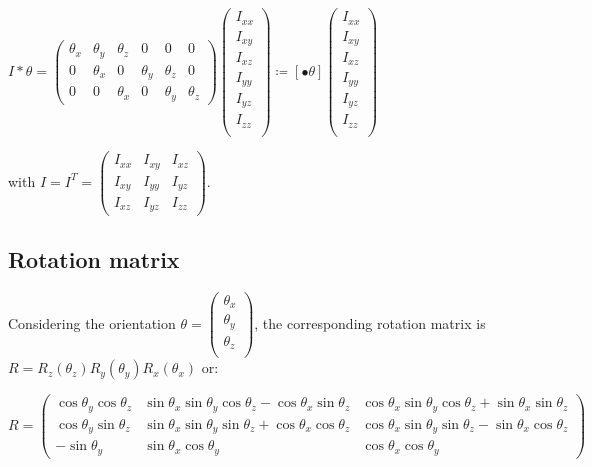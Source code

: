 \documentclass[\main/main.tex]{subfiles}
\begin{document}
{\centering
 $ I \ast \theta =
 \begin{pmatrix}
  \theta_x & \theta_y & \theta_z & 0        & 0        & 0        \\
  0        & \theta_x & 0        & \theta_y & \theta_z & 0        \\
  0        & 0        & \theta_x & 0        & \theta_y & \theta_z
 \end{pmatrix}
 \begin{pmatrix}
  I_{xx} \\
  I_{xy} \\
  I_{xz} \\
  I_{yy} \\
  I_{yz} \\
  I_{zz} \\
 \end{pmatrix}
 \coloneqq \left[ \bullet \theta \right]
 \begin{pmatrix}
  I_{xx} \\
  I_{xy} \\
  I_{xz} \\
  I_{yy} \\
  I_{yz} \\
  I_{zz} \\
 \end{pmatrix}$
 \par}

with $I = I^T =
\begin{pmatrix}
 I_{xx} & I_{xy} & I_{xz} \\
 I_{xy} & I_{yy} & I_{yz} \\
 I_{xz} & I_{yz} & I_{zz}
\end{pmatrix}
$.


\subsection{Rotation matrix}

\label{rotation}

Considering the orientation $\theta =
\begin{pmatrix}
 \theta_x \\
 \theta_y \\
 \theta_z \\
\end{pmatrix}
$,
the corresponding rotation matrix is $R = R_z(\theta_z)R_y(\theta_y)R_x(\theta_x)$ or:

\begin{equation*}
 R =
 \begin{pmatrix}
  \cos \theta_y \cos \theta_z & \sin \theta_x \sin \theta_y \cos \theta_z - \cos \theta_x \sin \theta_z & \cos \theta_x \sin \theta_y \cos \theta_z + \sin \theta_x \sin \theta_z \\
  \cos \theta_y \sin \theta_z & \sin \theta_x \sin \theta_y \sin \theta_z + \cos \theta_x \cos \theta_z & \cos \theta_x \sin \theta_y \sin \theta_z - \sin \theta_x \cos \theta_z \\
  - \sin \theta_y             & \sin \theta_x \cos \theta_y                                             & \cos \theta_x \cos \theta_y
 \end{pmatrix}
\end{equation*}
\end{document}
